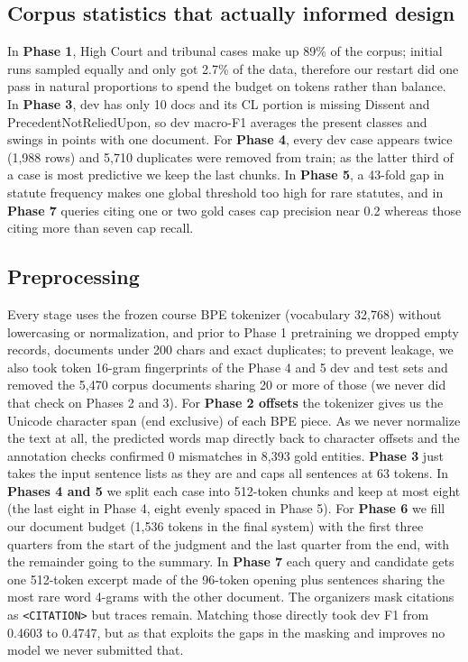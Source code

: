 \documentclass[11pt, oneside]{article}
\begin{document}
\subsection{Corpus statistics that actually informed design}
In \textbf{Phase 1}, High Court and tribunal cases make up 89\% of the corpus; initial runs sampled equally and only got 2.7\% of the data, therefore our restart did one pass in natural proportions to spend the budget on tokens rather than balance. In \textbf{Phase 3}, dev has only 10 docs and its CL portion is missing Dissent and PrecedentNotReliedUpon, so dev macro-F1 averages the present classes and swings in points with one document. For \textbf{Phase 4}, every dev case appears twice (1,988 rows) and 5,710 duplicates were removed from train; as the latter third of a case is most predictive we keep the last chunks. In \textbf{Phase 5}, a 43-fold gap in statute frequency makes one global threshold too high for rare statutes, and in \textbf{Phase 7} queries citing one or two gold cases cap precision near 0.2 whereas those citing more than seven cap recall.

\subsection{Preprocessing}\label{sec:preproc}
Every stage uses the frozen course BPE tokenizer (vocabulary 32,768) without lowercasing or normalization, and prior to Phase 1 pretraining we dropped empty records, documents under 200 chars and exact duplicates; to prevent leakage, we also took token 16-gram fingerprints of the Phase 4 and 5 dev and test sets and removed the 5,470 corpus documents sharing 20 or more of those (we never did that check on Phases 2 and 3). For \textbf{Phase 2 offsets} the tokenizer gives us the Unicode character span (end exclusive) of each BPE piece. As we never normalize the text at all, the predicted words map directly back to character offsets and the annotation checks confirmed 0 mismatches in 8,393 gold entities. \textbf{Phase 3} just takes the input sentence lists as they are and caps all sentences at 63 tokens. In \textbf{Phases 4 and 5} we split each case into 512-token chunks and keep at most eight (the last eight in Phase 4, eight evenly spaced in Phase 5). For \textbf{Phase 6} we fill our document budget (1,536 tokens in the final system) with the first three quarters from the start of the judgment and the last quarter from the end, with the remainder going to the summary. In \textbf{Phase 7} each query and candidate gets one 512-token excerpt made of the 96-token opening plus sentences sharing the most rare word 4-grams with the other document. The organizers mask citations as \texttt{<CITATION>} but traces remain. Matching those directly took dev F1 from 0.4603 to 0.4747, but as that exploits the gaps in the masking and improves no model we never submitted that.
\end{document}
